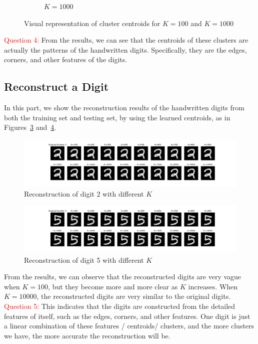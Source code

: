 \documentclass{article}
\begin{document}
\begin{figure}[htbp!]
\begin{subfigure}[b]{0.48\textwidth}
        \caption{$K = 1000$}
        \label{fig:1000-centroids}
    \end{subfigure}
    \caption{Visual representation of cluster centroids for $K = 100$ and $K = 1000$}
    \label{fig:centroids-100-1000}
\end{figure}

\textcolor{red}{Question 4:} From the results, we can see that the centroids of these clusters are actually the patterns of the handwritten digits. Specifically, they are the edges, corners, and other features of the digits.


\subsection{Reconstruct a Digit}
In this part, we show the reconstruction results of the handwritten digits from both the training set and testing set, by using the learned centroids, as in Figures~\ref{fig:digit-train} and~\ref{fig:digit-test}.

\begin{figure}[htbp!]
    \centering
    \includegraphics[width = \textwidth]{../Result/Digits/reconstruct-train-digit.png}
    \caption{Reconstruction of digit 2 with different $K$}
    \label{fig:digit-train}
\end{figure}
\begin{figure}[htbp!]
    \centering
    \includegraphics[width = \textwidth]{../Result/Digits/reconstruct-test-digit.png}
    \caption{Reconstruction of digit 5 with different $K$}
    \label{fig:digit-test}
\end{figure}

From the results, we can observe that the reconstructed digits are very vague when $K = 100$, but they become more and more clear as $K$ increases. 
When $K = 10000$, the reconstructed digits are very similar to the original digits. 
\textcolor{red}{Question 5:} This indicates that the digits are constructed from the detailed features of itself, such as the edges, corners, and other features.
One digit is just a linear combination of these features / centroids/ clusters, and the more clusters we have, the more accurate the reconstruction will be.
\end{document}
